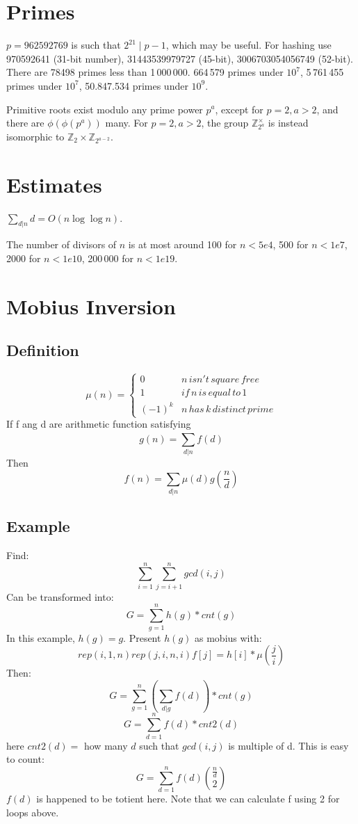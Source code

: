 \section{Primes}
$p=962592769$ is such that $2^{21} \mid p-1$, which may be useful. For hashing
use 970592641 (31-bit number), 31443539979727 (45-bit), 3006703054056749
(52-bit). There are 78498 primes less than 1\,000\,000. 664\,579 primes under $10^{7}$, 
5\,761\,455 primes under $10^{7}$, 50.847.534 primes under $10^{9}$.

Primitive roots exist modulo any prime power $p^a$, except for $p = 2, a > 2$, and there are $\phi(\phi(p^a))$ many.
For $p = 2, a > 2$, the group $\mathbb Z_{2^a}^\times$ is instead isomorphic to $\mathbb Z_2 \times \mathbb Z_{2^{a-2}}$.

\section{Estimates}
$\sum_{d|n} d = O(n \log \log n)$.

The number of divisors of $n$ is at most around 100 for $n < 5e4$, 500 for $n < 1e7$, 2000 for $n < 1e10$, 200\,000 for $n < 1e19$.

\section{Mobius Inversion}
\subsection{Definition}
\[\mu(n) =
	\left\{\begin{matrix}
	0 & n\,isn't\,square\,free\,\\ 
	1 & if\,n\,is\,equal\,to\,1  \\ 
	(-1)^{k} & n\,has\,k\,distinct\,prime    
	\end{matrix}\right.\]
	If f ang d are arithmetic function satisfying
	\[g(n)=\sum_{d|n}^{\,}f(d)\]
	Then
	\[f(n)=\sum_{d|n}^{\,}\mu(d)g(\frac{n}{d})\]
	\subsection{Example}
	Find:
	\[\sum_{i=1}^{n} \sum_{j=i+1}^{n} gcd(i,j)\]
	Can be transformed into:
	\[G = \sum_{g=1}^{n} h(g) * cnt(g)\]
	In this example, $h(g) = g$. Present $h(g)$ as mobius with:
	\[rep(i,1,n) rep(j,i,n,i) f[j]=h[i]*\mu(\frac{j}{i})\]
	Then:
	\[G = \sum_{g=1}^{n}(\sum_{d|g}f(d)) * cnt(g)\]
	\[G = \sum_{d=1}^{n} f(d) * cnt2(d)\] 
	here $cnt2(d) =$ how many $d$ such that $gcd(i,j)$ is multiple of d. This is easy to count:
	\[G = \sum_{d=1}^{n} f(d)\binom{\frac{n}{d}}{2}\] 
	$f(d)$ is happened to be totient here. Note that we can calculate f using 2 for loops above.
			
